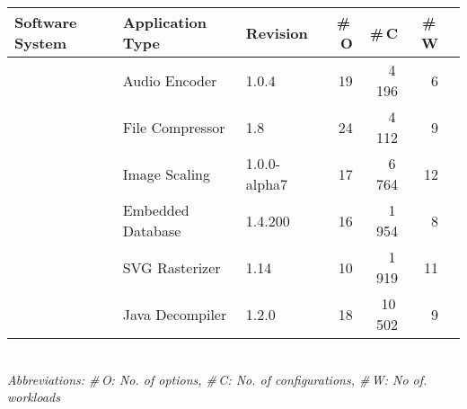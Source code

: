 \begin{tabularx}{\linewidth}{lllrrrr}
		\toprule
		\textbf{Software System} &  \textbf{Application Type} & \textbf{Revision} & \textbf{ \#\,O} & \textbf{\#\,C} & \textbf{\#\,W}  \\
		\midrule
		\jumper & Audio Encoder & 1.0.4 & 19 & 4\,196 & 6   \\
		
		\kanzi & File Compressor & 1.8 & 24 & 4\,112 & 9 \\
			
		\dconvert & Image Scaling & 1.0.0-alpha7 & 17 & 6\,764 & 12  \\
				
		\htwo & Embedded Database & 1.4.200 & 16 & 1\,954  & 8  \\
		
		\batik & SVG Rasterizer & 1.14 & 10 & 1\,919 &  11  \\
		
		\jadx & Java Decompiler & 1.2.0 & 18 & 10\,502 & 9  \\
\bottomrule

\end{tabularx}\\
{\vspace{1mm}\textit{Abbreviations: \#\,O: No. of options, \#\,C: No. of configurations, \#\,W: No of. workloads}}

